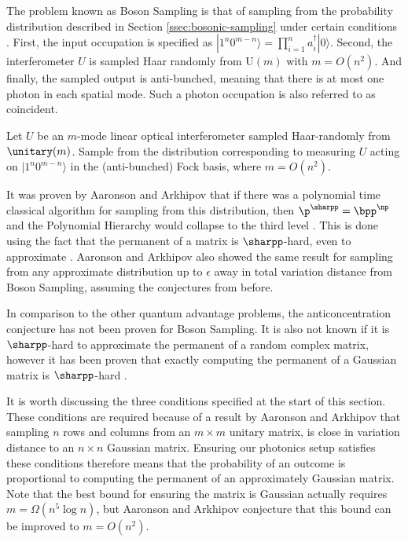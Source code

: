 The problem known as Boson Sampling is that of sampling from the probability distribution described in Section \ref{ssec:bosonic-sampling} under certain conditions \cite{aaronson2010report, aaronson2011}. First, the input occupation is specified as $|1^n 0^{m - n}\rangle = \prod_{i = 1}^n a_{i}^\dagger|0\rangle$. Second, the interferometer $U$ is sampled Haar randomly from U$(m)$ with $m=O(n^2)$. And finally, the sampled output is anti-bunched, meaning that there is at most one photon in each spatial mode. Such a photon occupation is also referred to as coincident.

\begin{problem} Let $U$ be an $m$-mode linear optical interferometer sampled Haar-randomly from $\unitary(m)$. Sample from the distribution corresponding to measuring $U$ acting on $|1^n0^{m-n}\rangle$ in the (anti-bunched) Fock basis, where $m=O(n^2)$.
\end{problem}

It was proven by Aaronson and Arkhipov that if there was a polynomial time classical algorithm for sampling from this distribution, then $\p^{\sharpp} = \bpp^{\np}$ and the Polynomial Hierarchy would collapse to the third level \cite{aaronson2010report, aaronson2011}. This is done using the fact that the permanent of a matrix is $\sharpp$-hard, even to approximate \cite{valiant1979, aaronson2011sharpp}. Aaronson and Arkhipov also showed the same result for sampling from any approximate distribution up to $\epsilon$ away in total variation distance from Boson Sampling, assuming the conjectures from before.

In comparison to the other quantum advantage problems, the anticoncentration conjecture has not been proven for Boson Sampling. It is also not known if it is $\sharpp$-hard to approximate the permanent of a random complex matrix, however it has been proven that exactly computing the permanent of a Gaussian matrix is $\sharpp$-hard \cite{aaronson2010report, aaronson2011}.

It is worth discussing the three conditions specified at the start of this section. These conditions are required because of a result by Aaronson and Arkhipov that sampling $n$ rows and columns from an $m\times m$ unitary matrix, is close in variation distance to an $n \times n$ Gaussian matrix. Ensuring our photonics setup satisfies these conditions therefore means that the probability of an outcome is proportional to computing the permanent of an approximately Gaussian matrix. Note that the best bound for ensuring the matrix is Gaussian actually requires $m=\Omega(n^5\log n)$, but Aaronson and Arkhipov conjecture that this bound can be improved to $m=O(n^2)$.

